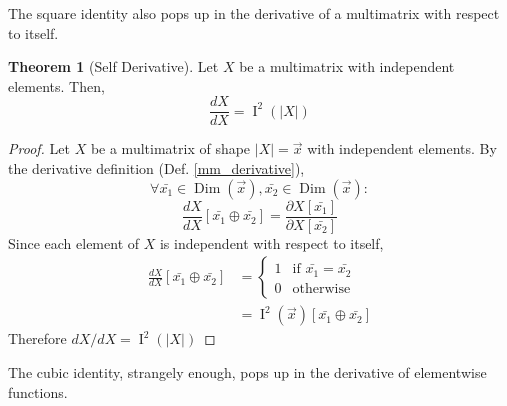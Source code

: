 \documentclass[12pt]{article}
\theoremstyle{definition}
\newtheorem{theorem}{Theorem}[section]
\theoremstyle{case}
\theoremstyle{ppart}
\DeclareMathOperator{\Dim}{Dim}
\DeclareMathOperator{\Ident}{I}
\begin{document}
The square identity also pops up in the derivative of a multimatrix
with respect to itself.

\begin{theorem}[Self Derivative]
Let $X$ be a multimatrix with independent elements. Then,
\[ \frac{dX}{dX} = \Ident^2(|X|) \]
\end{theorem}
\begin{proof}
Let $X$ be a multimatrix of shape $|X|=\vec{x}$ with independent elements.
By the derivative definition (Def. \ref{mm_derivative}),
\[
 \forall \bar{x_1} \in \Dim(\vec{x}),
         \bar{x_2} \in \Dim(\vec{x}):
\]
\[
 \frac{dX}{dX}[\bar{x_1} \oplus \bar{x_2}] = 
 \frac{\partial X[\bar{x_1}]}{\partial X[\bar{x_2}]}
\]
Since each element of $X$ is independent with respect to itself,
\begin{align*}
 \frac{dX}{dX}[\bar{x_1} \oplus \bar{x_2}]
 &= \left\{
	\begin{array}{ll}
		1 & \mbox{if } \bar{x_1} = \bar{x_2} \\
		0 & \mbox{otherwise}
	\end{array}
 \right. \\
 &= \Ident^2(\vec{x})[\bar{x_1} \oplus \bar{x_2}]
\end{align*}
Therefore $dX/dX = \Ident^2(|X|)$
\end{proof}

The cubic identity, strangely enough, pops up in the derivative of elementwise
functions.
\end{document}
